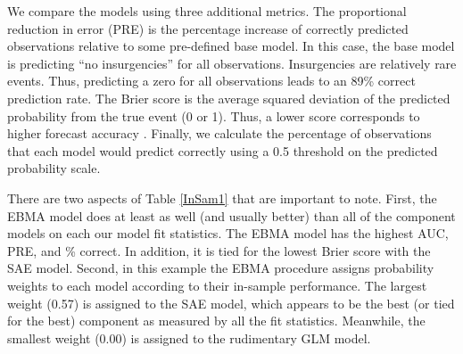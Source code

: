 \documentclass[pdftex,12pt,fullpage,oneside]{amsart}
\begin{document}
We compare the models using three additional metrics.  The
proportional reduction in error (PRE) is the percentage increase of
correctly predicted observations relative to some pre-defined base
model. In this case, the base model is predicting ``no insurgencies''
for all observations.  Insurgencies are relatively rare events.  Thus,
predicting a zero for all observations leads to an 89\% correct
prediction rate. The Brier score is the average squared deviation of
the predicted probability from the true event (0 or 1).  Thus, a lower
score corresponds to higher forecast accuracy \citep{Brier:1950}.
Finally, we calculate the percentage of observations that each model
would predict correctly using a 0.5 threshold on the predicted
probability scale.

There are two aspects of Table \ref{InSam1} that are important to
note.  First, the EBMA model does at least as well (and usually
better) than all of the component models on each our model fit
statistics.  The EBMA model has the highest AUC, PRE, and \% correct.
In addition, it is tied for the lowest Brier score with the SAE model.
Second, in this example the EBMA procedure assigns probability weights
to each model according to their in-sample performance.  The largest
weight (0.57) is assigned to the SAE model, which appears to be
the best (or tied for the best) component as measured by all the
fit statistics. Meanwhile, the smallest weight (0.00) is assigned to
the rudimentary GLM model.



\end{document}
